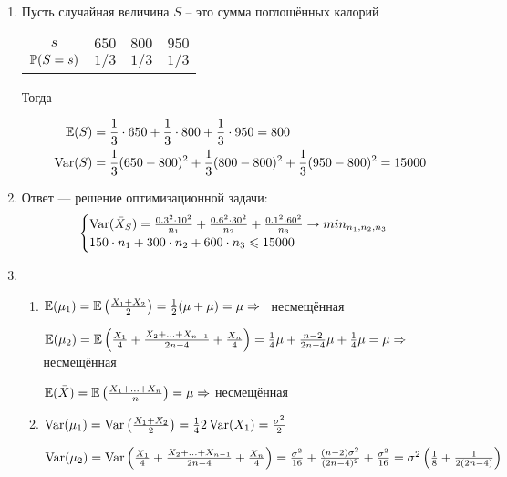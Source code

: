 \begin{enumerate}
\item Пусть случайная величина $S$ – это сумма поглощённых калорий

\begin{center}
\begin{tabular}{cccc}
\toprule
$s$ & $650$ & $800$ & $950$ \\
$\P(S=s)$ & $1/3$ & $1/3$ & $1/3$ \\ \bottomrule
\end{tabular}
\end{center}

Тогда

\begin{align*}
\E(S) &= \frac{1}{3}\cdot 650 + \frac{1}{3}\cdot 800 +  \frac{1}{3}\cdot 950 = 800 \\
\Var(S) &= \frac{1}{3}(650-800)^2 + \frac{1}{3}(800-800)^2 + \frac{1}{3}(950-800)^2 = 15000
\end{align*}

\item Ответ — решение оптимизационной задачи:
\[
\begin{cases}
\Var(\bar{X}_S) = \frac{0.3^2\cdot 10^2}{n_1} + \frac{0.6^2 \cdot 30^2}{n_2} + \frac{0.1^2 \cdot 60^2}{n_3} \to min_{n_1, n_2, n_3} \\
150\cdot n_1 + 300 \cdot n_2 + 600 \cdot n_3 \leq 15000
\end{cases}
\]

\item
\begin{enumerate}
\item $\E(\mu_1) = \E\left(\frac{X_1+X_2}{2}\right)  = \frac{1}{2}(\mu+\mu) = \mu \Rightarrow$  несмещённая

$\E(\mu_2) = \E \left(\frac{X_1}{4} + \frac{X_2+\ldots+X_{n-1}}{2n-4} + \frac{X_n}{4}\right) = \frac{1}{4}\mu + \frac{n-2}{2n-4}\mu + \frac{1}{4}\mu = \mu \Rightarrow$ несмещённая

$\E(\bar{X}) = \E\left(\frac{X_1 + \ldots + X_n}{n}\right) = \mu \Rightarrow$ несмещённая

\item $\Var(\mu_1) = \Var\left(\frac{X_1+X_2}{2}\right)  = \frac{1}{4}2\Var(X_1) = \frac{\sigma^2}{2}$

$\Var(\mu_2) = \Var \left(\frac{X_1}{4} + \frac{X_2+\ldots+X_{n-1}}{2n-4} + \frac{X_n}{4}\right)  = \frac{\sigma^2}{16} + \frac{(n-2)\sigma^2}{(2n-4)^2} + \frac{\sigma^2}{16} = \sigma^2\left(\frac{1}{8} + \frac{1}{2(2n-4)} \right)$


\end{enumerate}
\end{enumerate}
